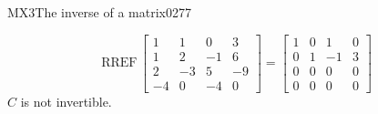 \begin{exercise}{MX3}{The inverse of a matrix}{0277}
\begin{exerciseAnswer}
 

 \[\mathrm{RREF}\,\left[\begin{array}{cccc}
1 & 1 & 0 & 3 \\
1 & 2 & -1 & 6 \\
2 & -3 & 5 & -9 \\
-4 & 0 & -4 & 0
\end{array}\right]=\left[\begin{array}{cccc}
1 & 0 & 1 & 0 \\
0 & 1 & -1 & 3 \\
0 & 0 & 0 & 0 \\
0 & 0 & 0 & 0
\end{array}\right]\] \(C\) is not invertible. 

 \end{exerciseAnswer}
 \end{exercise}



